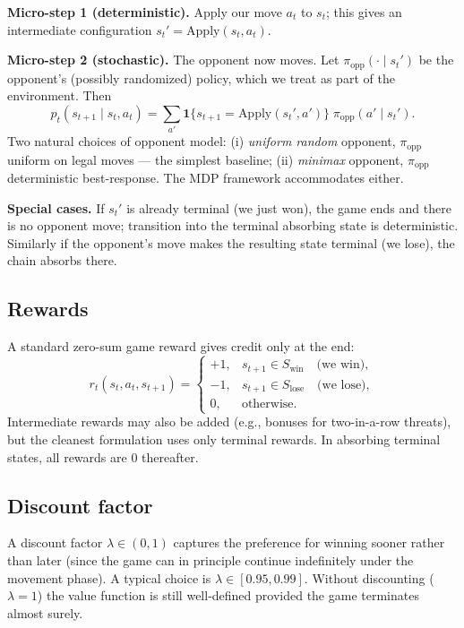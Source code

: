 \documentclass[12pt]{article}
\begin{document}
\textbf{Micro-step 1 (deterministic).} Apply our move $a_t$ to $s_t$; this gives an intermediate configuration $s_t' = \text{Apply}(s_t, a_t)$.

\textbf{Micro-step 2 (stochastic).} The opponent now moves. Let $\pi_{\text{opp}}(\cdot \mid s_t')$ be the opponent's (possibly randomized) policy, which we treat as part of the environment. Then
\[
  p_t(s_{t+1} \mid s_t, a_t) = \sum_{a'} \mathbf{1}\{s_{t+1} = \text{Apply}(s_t', a')\}\;\pi_{\text{opp}}(a' \mid s_t').
\]
Two natural choices of opponent model: (i) \emph{uniform random} opponent, $\pi_{\text{opp}}$ uniform on legal moves --- the simplest baseline; (ii) \emph{minimax} opponent, $\pi_{\text{opp}}$ deterministic best-response. The MDP framework accommodates either.

\textbf{Special cases.} If $s_t'$ is already terminal (we just won), the game ends and there is no opponent move; transition into the terminal absorbing state is deterministic. Similarly if the opponent's move makes the resulting state terminal (we lose), the chain absorbs there.

\subsection*{Rewards}

A standard zero-sum game reward gives credit only at the end:
\[
  r_t(s_t, a_t, s_{t+1}) = \begin{cases}
    +1, & s_{t+1} \in S_{\text{win}} \quad \text{(we win)}, \\
    -1, & s_{t+1} \in S_{\text{lose}} \quad \text{(we lose)}, \\
    0,  & \text{otherwise}.
  \end{cases}
\]
Intermediate rewards may also be added (e.g., bonuses for two-in-a-row threats), but the cleanest formulation uses only terminal rewards. In absorbing terminal states, all rewards are $0$ thereafter.

\subsection*{Discount factor}

A discount factor $\lambda \in (0, 1)$ captures the preference for winning sooner rather than later (since the game can in principle continue indefinitely under the movement phase). A typical choice is $\lambda \in [0.95, 0.99]$. Without discounting ($\lambda = 1$) the value function is still well-defined provided the game terminates almost surely.
\end{document}
